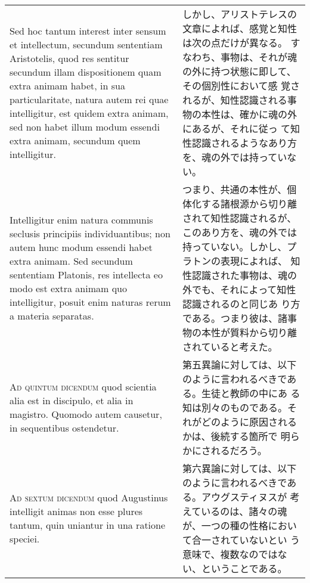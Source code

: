 \documentclass[paper=a4paper,fontsize=10pt,jafontsize=9pt,titlepage]{jlreq}
\begin{document}
\begin{longtable}{p{21em}p{21em}}
\\


 Sed hoc tantum interest inter sensum et intellectum, secundum
 sententiam Aristotelis, quod res sentitur secundum illam
 dispositionem quam extra animam habet, in sua particularitate, natura
 autem rei quae intelligitur, est quidem extra animam, sed non habet
 illum modum essendi extra animam, secundum quem intelligitur.

&

しかし、アリストテレスの文章によれば、感覚と知性は次の点だけが異なる。
すなわち、事物は、それが魂の外に持つ状態に即して、その個別性において感
覚されるが、知性認識される事物の本性は、確かに魂の外にあるが、それに従っ
 て知性認識されるようなあり方を、魂の外では持っていない。
 
 \\
 
 Intelligitur enim natura communis seclusis principiis
 individuantibus; non autem hunc modum essendi habet extra animam. Sed
 secundum sententiam Platonis, res intellecta eo modo est extra animam
 quo intelligitur, posuit enim naturas rerum a materia separatas.

&

つまり、共通の本性が、個体化する諸根源から切り離されて知性認識されるが、
このあり方を、魂の外では持っていない。しかし、プラトンの表現によれば、
知性認識された事物は、魂の外でも、それによって知性認識されるのと同じあ
り方である。つまり彼は、諸事物の本性が質料から切り離されていると考えた。
 
\\

{\scshape Ad quintum dicendum} quod scientia alia est in discipulo, et
alia in magistro. Quomodo autem causetur, in sequentibus ostendetur.

&

第五異論に対しては、以下のように言われるべきである。生徒と教師の中にあ
る知は別々のものである。それがどのように原因されるかは、後続する箇所で
明らかにされるだろう。
 
\\

{\scshape Ad sextum dicendum} quod Augustinus intelligit animas non
esse plures tantum, quin uniantur in una ratione speciei.

&

第六異論に対しては、以下のように言われるべきである。アウグスティヌスが
考えているのは、諸々の魂が、一つの種の性格において合一されていないとい
う意味で、複数なのではない、ということである。

\end{longtable}
\newpage
\end{document}
